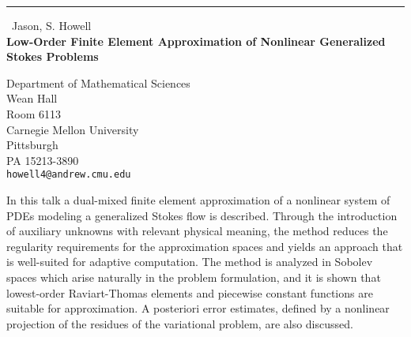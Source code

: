\documentclass{report}
\begin{document}
\begin{center}
\rule{6in}{1pt} \
{\large Jason, S. Howell \\
{\bf Low-Order Finite Element Approximation of Nonlinear Generalized Stokes Problems}}

Department of Mathematical Sciences \\ Wean Hall \\ Room 6113 \\ Carnegie Mellon University \\ Pittsburgh \\ PA 15213-3890
\\
{\tt howell4@andrew.cmu.edu}\end{center}

In this talk a dual-mixed finite element approximation of a nonlinear
system of PDEs modeling a generalized Stokes flow is described. Through
the introduction of auxiliary unknowns with relevant physical meaning,
the method reduces the regularity requirements for the approximation
spaces and yields an approach that is well-suited for adaptive
computation. The method is analyzed in Sobolev spaces which arise
naturally in the problem formulation, and it is shown that lowest-order
Raviart-Thomas elements and piecewise constant functions are suitable for
approximation. A posteriori error estimates, defined by a nonlinear
projection of the residues of the variational problem, are also
discussed.
\end{document}
